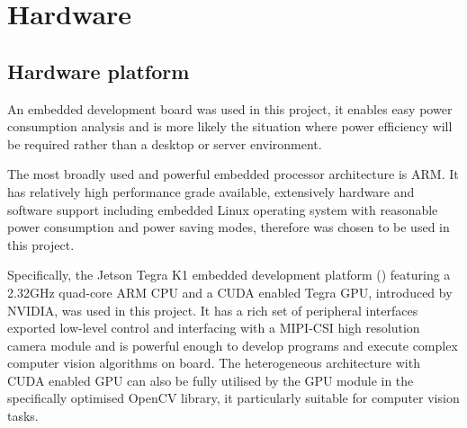 

\section{Hardware}


\subsection{Hardware platform}


An embedded development board was used in this project, it enables easy power consumption analysis and  is more likely the situation where power efficiency will be required rather than a desktop or server environment.

The most broadly used and powerful embedded processor architecture is ARM. It has relatively high performance grade available, extensively hardware and software support including embedded Linux operating system with reasonable power consumption and  power saving modes, therefore was chosen to be used in this project.

Specifically, the Jetson Tegra K1 embedded development platform \cite{NVIDIA:tk1} () featuring a 2.32GHz quad-core ARM CPU and a CUDA enabled Tegra GPU, introduced by NVIDIA, was used in this project. It has a rich set of peripheral interfaces exported  low-level control and interfacing with a MIPI-CSI high resolution camera module and is powerful enough to develop programs and execute complex computer vision algorithms on board. The heterogeneous architecture with CUDA enabled GPU can also be fully utilised by the GPU module in the specifically optimised OpenCV library,  it particularly suitable for computer vision tasks.

